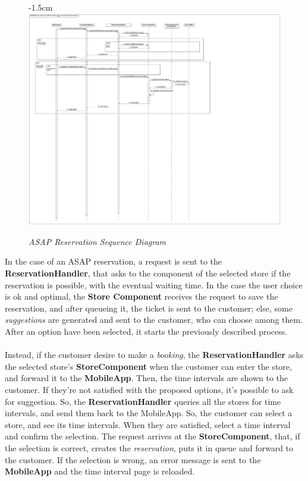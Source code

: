 \documentclass{article}
\begin{document}
	
	\begin{figure}[H]
		\begin{adjustwidth} {-1.5cm}{}
			\centering
			\includegraphics[scale=0.3]{Sequence Diagrams/sd__CustomerASAPReservation__CustomerASAPReservation.png}
		\end{adjustwidth}
		\caption{\emph{ASAP Reservation Sequence Diagram}}
	\end{figure}
	In the case of an ASAP reservation, a request is sent to the {\bfseries ReservationHandler}, that asks to the component of the selected store if the reservation is possible, with the eventual waiting time. In the case the user choice is ok and optimal, the {\bfseries Store Component} receives the request to save the reservation, and after queueing it, the ticket is sent to the customer; else, some \emph{suggestions} are generated and sent to the customer, who can choose among them. After an option have been selected, it starts the previously described process.\\\\
	Instead, if the customer desire to make a \emph{booking}, the {\bfseries ReservationHandler} asks the selected store's {\bfseries StoreComponent} when the customer can enter the store, and forward it to the {\bfseries MobileApp}. Then, the time intervals are shown to the customer. If they're not satisfied with the proposed options, it's possible to ask for suggestion. So, the {\bfseries ReservationHandler} queries all the stores for time intervals, and send them back to the MobileApp. So, the customer can select a store, and see its time intervals. When they are satisfied, select a time interval and confirm the selection. The request arrives at the {\bfseries StoreComponent}, that, if the selection is correct, creates the \emph{reservation}, puts it in queue and forward to the customer. If the selection is wrong, an error message is sent to the {\bfseries MobileApp} and the time interval page is reloaded.
	\bigskip
	
\end{document}
